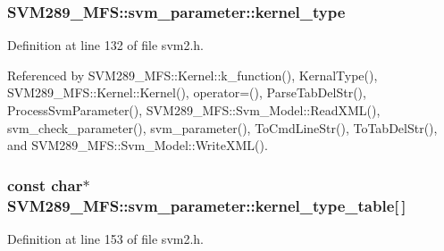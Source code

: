 \subsubsection[{\texorpdfstring{kernel\+\_\+type}{kernel_type}}]{ S\+V\+M289\+\_\+\+M\+F\+S\+::svm\+\_\+parameter\+::kernel\+\_\+type}\hypertarget{struct_s_v_m289___m_f_s_1_1svm__parameter_aeaa6b9df55b7ce77adebe83b1ef797ee}{}\label{struct_s_v_m289___m_f_s_1_1svm__parameter_aeaa6b9df55b7ce77adebe83b1ef797ee}


Definition at line 132 of file svm2.\+h.



Referenced by S\+V\+M289\+\_\+\+M\+F\+S\+::\+Kernel\+::k\+\_\+function(), Kernal\+Type(), S\+V\+M289\+\_\+\+M\+F\+S\+::\+Kernel\+::\+Kernel(), operator=(), Parse\+Tab\+Del\+Str(), Process\+Svm\+Parameter(), S\+V\+M289\+\_\+\+M\+F\+S\+::\+Svm\+\_\+\+Model\+::\+Read\+X\+M\+L(), svm\+\_\+check\+\_\+parameter(), svm\+\_\+parameter(), To\+Cmd\+Line\+Str(), To\+Tab\+Del\+Str(), and S\+V\+M289\+\_\+\+M\+F\+S\+::\+Svm\+\_\+\+Model\+::\+Write\+X\+M\+L().

\subsubsection[{\texorpdfstring{kernel\+\_\+type\+\_\+table}{kernel_type_table}}]{\setlength{\rightskip}{0pt plus 5cm}const char$\ast$ S\+V\+M289\+\_\+\+M\+F\+S\+::svm\+\_\+parameter\+::kernel\+\_\+type\+\_\+table\mbox{[}$\,$\mbox{]}\hspace{0.3cm}{\ttfamily [static]}}\hypertarget{struct_s_v_m289___m_f_s_1_1svm__parameter_a614676ddb8edd148b9ec44f190db5004}{}\label{struct_s_v_m289___m_f_s_1_1svm__parameter_a614676ddb8edd148b9ec44f190db5004}


Definition at line 153 of file svm2.\+h.

